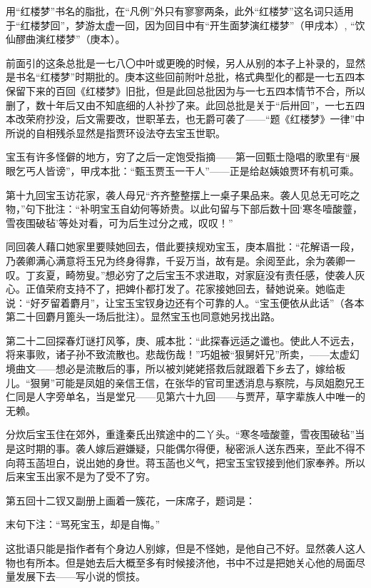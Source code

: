 \par 用“红楼梦”书名的脂批，在“凡例”外只有寥寥两条，此外“红楼梦”这名词只适用于“红楼梦回”，梦游太虚一回，因为回目中有“开生面梦演红楼梦”（甲戌本）, “饮仙醪曲演红楼梦”（庚本）。
\par 前面引的这条总批是一七八〇中叶或更晚的时候，另人从别的本子上补录的，显然是书名“红楼梦”时期批的。庚本这些回前附叶总批，格式典型化的都是一七五四本保留下来的百回《红楼梦》旧批，但是此回总批因为与一七五四本情节不合，所以删了，数十年后又由不知底细的人补抄了来。此回总批是关于“后卅回”，一七五四本改荣府抄没，后文需要改，世职革去，也无爵可袭了——“题《红楼梦》一律”中所说的自相残杀显然是指贾环设法夺去宝玉世职。
\par 宝玉有许多怪僻的地方，穷了之后一定饱受指摘——第一回甄士隐唱的歌里有“展眼乞丐人皆谤”，甲戌本批：“甄玉贾玉一干人”——正是给赵姨娘贾环有机可乘。
\par 第十九回宝玉访花家，袭人母兄“齐齐整整摆上一桌子果品来。袭人见总无可吃之物，”句下批注：“补明宝玉自幼何等娇贵。以此句留与下部后数十回‘寒冬噎酸虀，雪夜围破毡’等处对看，可为后生过分之戒，叹叹！”
\par 同回袭人藉口她家里要赎她回去，借此要挟规劝宝玉，庚本眉批：“花解语一段，乃袭卿满心满意将玉兄为终身得靠，千妥万当，故有是。余阅至此，余为袭卿一叹。丁亥夏，畸笏叟。”想必穷了之后宝玉不求进取，对家庭没有责任感，使袭人灰心。正值荣府支持不了，把婢仆都打发了。花家接她回去，替她说亲。她临走说：“好歹留着麝月”，让宝玉宝钗身边还有个可靠的人。“宝玉便依从此话”（各本第二十回麝月篦头一场后批注）。显然宝玉也同意她另找出路。
\par 第二十二回探春灯谜打风筝，庚、戚本批：“此探春远适之谶也。使此人不远去，将来事败，诸子孙不致流散也。悲哉伤哉！”巧姐被“狠舅奸兄”所卖，——太虚幻境曲文——想必是流散后的事，所以被刘姥姥搭救后就跟着下乡去了，嫁给板儿。“狠舅”可能是凤姐的亲信王信，在张华的官司里透消息与察院，与凤姐胞兄王仁同是人字旁单名，当是堂兄——见第六十九回——与贾芹，草字辈族人中唯一的无赖。
\par 分炊后宝玉住在郊外，重逢秦氏出殡途中的二丫头。“寒冬噎酸虀，雪夜围破毡”当是这时期的事。袭人嫁后避嫌疑，只能偶尔得便，秘密派人送东西来，至此不得不向蒋玉菡坦白，说出她的身世。蒋玉菡也义气，把宝玉宝钗接到他们家奉养。所以后来宝玉出家不是为了受不了穷。
\par 第五回十二钗又副册上画着一簇花，一床席子，题词是：
\par 末句下注：“骂死宝玉，却是自悔。”
\par 这批语只能是指作者有个身边人别嫁，但是不怪她，是他自己不好。显然袭人这人物也有所本。但是她去后大概至多有时候接济他，书中不过是把她关心他的局面尽量发展下去——写小说的惯技。
